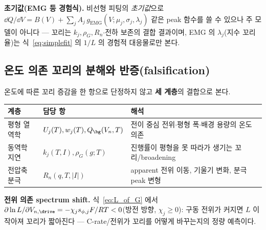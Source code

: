 \textbf{초기값(EMG 등 경험식).} 비선형 피팅의 \emph{초기값}으로 $\dd Q/\dd V=B(V)+\sum_j A_j\,g_\mathrm{EMG}
(V;\mu_j,\sigma_j,\lambda_j)$ 같은 peak 함수를 쓸 수 있으나 주 모델이 아니다 — 꼬리는 $k_j,\rho_G,R_n$$\cdot$전하
보존의 결합 결과이며, EMG 의 $\lambda_j$(지수 꼬리율)는 식~\eqref{eq:simplefit} 의 $1/L$ 의 경험적 대응물로만 본다.

\subsection{온도 의존 꼬리의 분해와 반증(falsification)}\label{sec:falsify}
온도에 따른 꼬리 증감을 한 항으로 단정하지 않고 \textbf{세 계층}의 결합으로 본다.
\begin{longtable}{p{} p{} p{}}
\toprule 계층 & 담당 항 & 해석 \\ \midrule \endhead
평형 열역학 & $U_j(T),w_j(T),Q_\bg(V_n,T)$ & 전이 중심 전위$\cdot$평형 폭$\cdot$배경 용량의 온도 의존 \\
동역학 지연 & $k_j(T,I),\rho_G(g;T)$ & 진행률이 평형을 못 따라가 생기는 꼬리/broadening \\
전압축 분극 & $R_n(q,T,|I|)$ & apparent 전위 이동, 기울기 변화, 분극 peak 변형 \\
\bottomrule
\end{longtable}
\textbf{전위 의존 spectrum shift.} 식~\eqref{eq:L_of_G} 에서 $\partial\ln L/\partial V_{n,\drive}
=-\chi_j s_{\phi,j}F/RT<0$(방전 방향, $\chi_j\ge0$): 구동 전위가 커지면 $L$ 이 작아져 꼬리가 짧아진다 — C-rate/전위가
꼬리를 어떻게 바꾸는지의 정량 예측이다.

